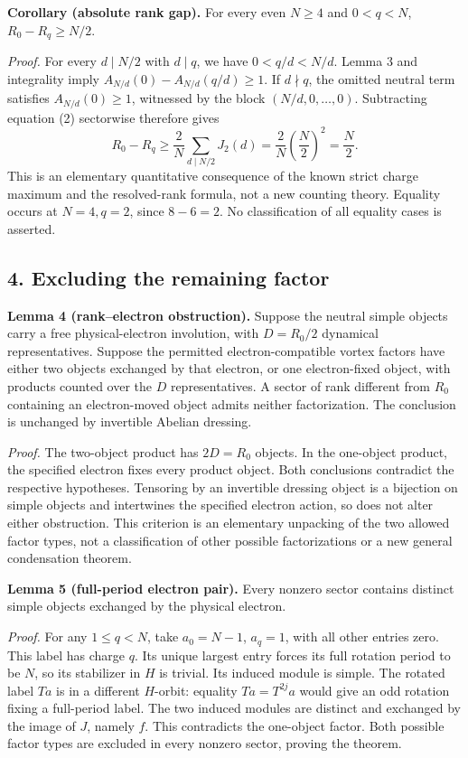 \documentclass[
  11pt,
]{article}
\begin{document}
\textbf{Corollary (absolute rank gap).} For every even \(N\ge4\) and
\(0<q<N\), \(R_0-R_q\ge N/2\).

\textit{Proof.} For every \(d\mid N/2\) with \(d\mid q\), we have
\(0<q/d<N/d\). Lemma 3 and integrality imply
\(A_{N/d}(0)-A_{N/d}(q/d)\ge1\). If \(d\nmid q\), the omitted
neutral term satisfies \(A_{N/d}(0)\ge1\), witnessed by the block
\((N/d,0,\ldots,0)\). Subtracting equation (2) sectorwise therefore gives
\[
 R_0-R_q\ge\frac2N\sum_{d\mid N/2}J_2(d)
 =\frac2N\left(\frac N2\right)^2=\frac N2.
\]
This is an elementary quantitative consequence of the known strict
charge maximum and the resolved-rank formula, not a new counting theory.
Equality occurs at \(N=4,q=2\), since \(8-6=2\). No classification of
all equality cases is asserted.

\subsection{4. Excluding the remaining
factor}\label{excluding-the-remaining-factor}

\textbf{Lemma 4 (rank--electron obstruction).} Suppose the neutral
simple objects carry a free physical-electron involution, with
\(D=R_0/2\) dynamical representatives. Suppose the permitted
electron-compatible vortex factors have either two objects exchanged
by that electron, or one electron-fixed object, with products counted
over the \(D\) representatives. A sector of rank different from \(R_0\)
containing an electron-moved object admits neither factorization.
The conclusion is unchanged by invertible Abelian dressing.

\textit{Proof.} The two-object product has \(2D=R_0\) objects.
In the one-object product, the specified electron fixes every product
object. Both conclusions contradict the respective hypotheses.
Tensoring by an invertible dressing object is a bijection on simple
objects and intertwines the specified electron action, so does not
alter either obstruction. This criterion is an elementary unpacking of
the two allowed factor types, not a classification of other possible
factorizations or a new general condensation theorem.

\textbf{Lemma 5 (full-period electron pair).} Every nonzero sector
contains distinct simple objects exchanged by the physical electron.

\textit{Proof.} For any \(1\le q<N\), take \(a_0=N-1\), \(a_q=1\), with all other
entries zero. This label has charge \(q\). Its unique largest entry
forces its full rotation period to be \(N\), so its stabilizer in \(H\)
is trivial. Its induced module is simple. The rotated label \(Ta\) is in
a different \(H\)-orbit: equality \(Ta=T^{2j}a\) would give an odd
rotation fixing a full-period label. The two induced modules are
distinct and exchanged by the image of \(J\), namely \(f\). This
contradicts the one-object factor. Both possible factor types are
excluded in every nonzero sector, proving the theorem.
\end{document}
